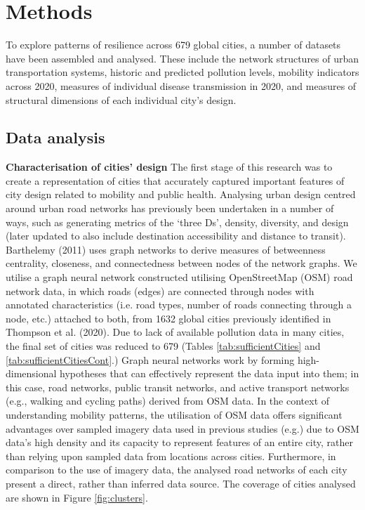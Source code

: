 \documentclass[preprint,12pt]{elsarticle}
\begin{document}





\section*{Methods}

To explore patterns of resilience across 679 global cities, a number of datasets have been assembled and analysed. These include the network structures of urban transportation systems, historic and predicted pollution levels, mobility indicators across 2020, measures of individual disease transmission in 2020, and measures of structural dimensions of each individual city's design.

\subsection*{Data analysis}
\textbf{Characterisation of cities' design}
The first stage of this research was to create a representation of cities that accurately captured important features of city design related to mobility and public health. Analysing urban design centred around urban road networks has previously been undertaken in a number of ways, such as generating metrics of the `three Ds'\cite{Ewing2010}, density, diversity, and design (later updated to also include destination accessibility and distance to transit). Barthelemy (2011)\cite{Barthelemy2011} uses graph networks to derive measures of betweenness centrality, closeness, and connectedness between nodes of the network graphs. We utilise a graph neural network constructed utilising OpenStreetMap (OSM) road network data\cite{Boeing2017a}, in which roads (edges) are connected through nodes with annotated characteristics (i.e. road types, number of roads connecting through a node, etc.) attached to both, from 1632 global cities previously identified in Thompson et al. (2020)\cite{Thompson2020}. Due to lack of available pollution data in many cities, the final set of cities was reduced to 679 (Tables \ref{tab:sufficientCities} and \ref{tab:sufficientCitiesCont}.) Graph neural networks work by forming high-dimensional hypotheses that can effectively represent the data input into them; in this case, road networks, public transit networks, and active transport networks (e.g., walking and cycling paths) derived from OSM data. In the context of understanding mobility patterns, the utilisation of OSM data offers significant advantages over sampled imagery data used in previous studies (e.g.\cite{Thompson2020,seneviratne2021self}) due to OSM data's high density and its capacity to represent features of an entire city, rather than relying upon sampled data from locations across cities. Furthermore, in comparison to the use of imagery data, the analysed road networks of each city present a direct, rather than inferred data source. The coverage of cities analysed are shown in Figure \ref{fig:clusters}.
\end{document}
